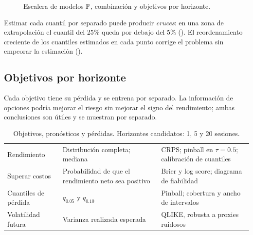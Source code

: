 \begin{figure}[H]
\centering
\resizebox{\linewidth}{!}{}
\caption{Escalera de modelos $\P$, combinación y objetivos por horizonte.}
\label{fig:escalera}
\end{figure}


Estimar cada cuantil por separado puede producir \emph{cruces}: en una zona de extrapolación el cuantil
del 25\% queda por debajo del 5\% (). El reordenamiento creciente de los cuantiles
estimados en cada punto corrige el problema sin empeorar la estimación
\citep{chernozhukov2010} ().



\subsection{Objetivos por horizonte}\label{sec:objetivos}

Cada objetivo tiene su pérdida y se entrena por separado. La información de opciones podría mejorar el
riesgo sin mejorar el signo del rendimiento; ambas conclusiones son útiles y se muestran por separado.

\begin{table}[H]
\centering\small
\caption{Objetivos, pronósticos y pérdidas. Horizontes candidatos: 1, 5 y 20 sesiones.}
\label{tab:objetivos}
\begin{tabularx}{\linewidth}{@{}l Y Y@{}}
\toprule
{} &  & \\
\midrule
Rendimiento & Distribución completa; mediana & CRPS; pinball en $\tau=0.5$; calibración de cuantiles\\
Superar costos & Probabilidad de que el rendimiento neto sea positivo & Brier y log score; diagrama de fiabilidad\\
Cuantiles de pérdida & $q_{0.05}$ y $q_{0.10}$ & Pinball; cobertura y ancho de intervalos\\
Volatilidad futura & Varianza realizada esperada & QLIKE, robusta a proxies ruidosos \citep{patton2011}\\
\bottomrule
\end{tabularx}
\end{table}

